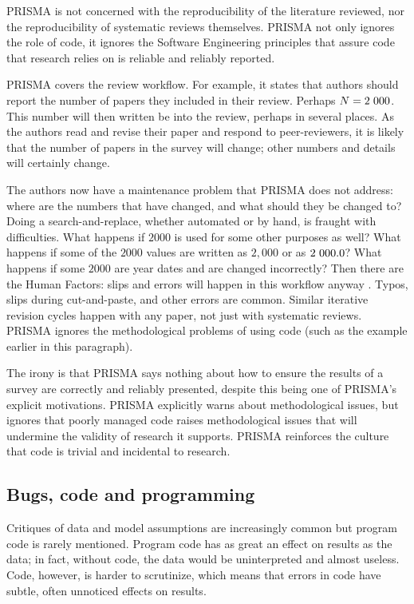 \documentclass{comjnl}
\begin{document}
PRISMA is not concerned with the reproducibility of the literature reviewed, nor the reproducibility of systematic reviews themselves. PRISMA not only ignores the role of code, it ignores the Software Engineering principles that assure code that research relies on is reliable and reliably reported. 

PRISMA covers the review workflow. For example, it states that authors should report the number of papers they included in their review. Perhaps $N=2\hskip 0.3em 000$. This number will then written be into the review, perhaps in several places. As the authors read and revise their paper and respond to peer-reviewers, it is likely that the number of papers in the survey will change; other numbers and details will certainly change. 

The authors now have a maintenance problem that PRISMA does not address: where are the numbers that have changed, and what should they be changed to? Doing a search-and-replace, whether automated or by hand, is fraught with difficulties. What happens if $2000$ is used for some other purposes as well? What happens if some of the $2000$ values are written as $2,000$ or as $2\hskip 0.3em 000.0$? What happens if some $2000$ are year dates and are changed incorrectly? Then there are the Human Factors: slips and errors will happen in this workflow anyway \cite{engima}. Typos, slips during cut-and-paste, and other errors are common. Similar iterative revision cycles happen with any paper, not just with systematic reviews. PRISMA ignores the methodological problems of using code (such as the example earlier in this paragraph). 

The irony is that PRISMA says nothing about how to ensure the results of a survey are correctly and reliably presented, despite this being one of PRISMA's explicit motivations. PRISMA explicitly warns about methodological issues, but ignores that poorly managed code raises methodological issues that will undermine the validity of research it supports. PRISMA reinforces the culture that code is trivial and incidental to research.

\subsection{Bugs, code and programming}\label{knowledge}
Critiques of data and model assumptions are increasingly common \cite{critiques,diagnosis-reviews} but program code is rarely mentioned. Program code has as great an effect on results as the data; in fact, without code, the data would be uninterpreted and almost useless. Code, however, is harder to scrutinize, which means that errors in code have subtle, often unnoticed effects on results.
\end{document}
